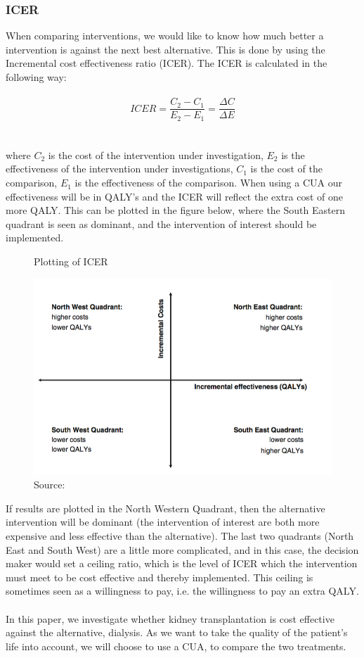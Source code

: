 \documentclass[a4paper,12pt]{article}
\begin{document}
\subsubsection*{ICER}
When comparing interventions, we would like to know how much better a intervention is against the next best alternative. This is done by using the Incremental cost effectiveness ratio (ICER). The ICER is calculated in the following way: 
\\\\
\begin{equation} ICER=\dfrac{C_2-C_1}{E_2-E_1} =\dfrac{\varDelta C}{\varDelta E}
\end{equation}
\\\\
where $ C_2$ is the cost of the intervention under investigation, $ E_2$ is the effectiveness of the intervention under investigations, $ C_1$ is the cost of the comparison, $ E_1$ is the effectiveness of the comparison. When using a CUA our effectiveness will be in QALY’s and the ICER will reflect the extra cost of one more QALY. This can be plotted in the figure below, where the South Eastern quadrant is seen as dominant, and the intervention of interest should be implemented. 

\begin{figure} [h]
	\centering
	\caption{Plotting of ICER}
	\label{fig:ICER}
	\includegraphics[width=0.7\linewidth]{Pictures/ICER}
	\caption*{Source:  \cite{CUAbog} }
\end{figure}

If results are plotted in the North Western Quadrant, then the alternative intervention will be dominant (the intervention of interest are both more expensive and less effective than the alternative). The last two quadrants (North East and South West) are a little more complicated, and in this case, the decision maker would set a ceiling ratio, which is the level of ICER which the intervention must meet to be cost effective and thereby implemented.   This ceiling is sometimes seen as a willingness to pay, i.e. the willingness to pay an extra QALY. 
\\\\
In this paper, we investigate whether kidney transplantation is cost effective against the alternative, dialysis. As we want to take the quality of the patient’s life into account, we will choose to use a CUA, to compare the two treatments.  
\end{document}
